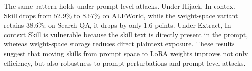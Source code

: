 \documentclass{llmxive}
\providecommand{\textttt}[1]{\texttt{#1}}
\providecommand{\method}{\textbf{\textttt{LatentSkill}}}
\begin{document}
The same pattern holds under prompt-level attacks. Under Hijack, In-context Skill drops from 52.9\% to 8.57\% on ALFWorld, while the weight-space variant retains 38.6\%; on Search-QA, it drops by only 1.6 points. Under Extract, In-context Skill is vulnerable because the skill text is directly present in the prompt, whereas weight-space storage reduces direct plaintext exposure. These results suggest that moving skills from prompt space to LoRA weights improves not only efficiency, but also robustness to prompt perturbations and prompt-level attacks.
 
\end{document}
